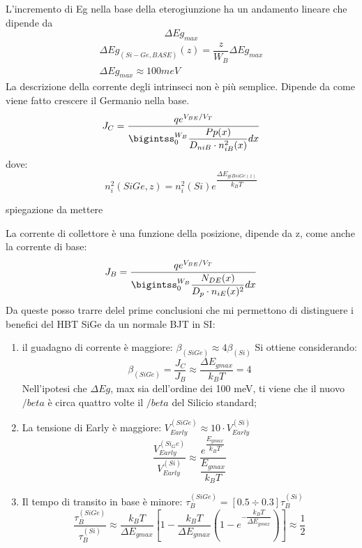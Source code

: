  L’incremento di Eg nella base della eterogiunzione ha un andamento lineare che dipende da 
\[\Delta Eg_{max}\]
\begin{align}
    \Delta Eg_{(Si-Ge,BASE)}(z)=\dfrac{z}{W_B}\Delta Eg_{max} \\
    \Delta Eg_{max} \approx100meV
\end{align}
La descrizione della corrente degli intrinseci non è più semplice. Dipende da come viene fatto crescere il Germanio nella base.
\begin{equation}
    J_C=\dfrac{qe^{V_{BE}/V_T}}{\bigintss_{0}^{W_B}\dfrac{Pp(x)}{D_{niB} \cdot n_{iB}^2(x)}dx}
\end{equation}
%
dove:
%
\begin{equation}
    n_{i}^2(SiGe,z)=n_i^2(Si)e^{\dfrac{\Delta E_{giBsiGe(z)}}{k_BT}}
\end{equation}
%
\begin{exbox}
    spiegazione da mettere
\end{exbox}
%
La corrente di collettore è una funzione della posizione, dipende da z, come anche la corrente di base:
%
\begin{equation}
    J_B=\dfrac{qe^{V_{BE}/V_T}}{\bigintss_{0}^{W_B}\dfrac{N_{DE}(x)}{D_{p}\cdot n_{iE}(x)^2}dx}
\end{equation}
%
Da queste posso trarre delel prime conclusioni che mi permettono di distinguere i benefici del HBT SiGe da un normale BJT in SI:
\begin{enumerate}
    \item il guadagno di corrente è maggiore: $\beta_{(SiGe)}\approx 4 \beta_{(Si)}$
    Si ottiene considerando:
    \begin{equation}
    \beta_{(SiGe)}=\dfrac{J_C}{J_B}\approx \dfrac{\Delta E_{gmax}}{k_BT}=4 
    \end{equation}
    Nell’ipotesi che $\Delta Eg$, max sia dell’ordine dei 100 meV, ti viene che il nuovo $/beta$ è circa quattro volte il $/beta$ del Silicio standard;

    \item La tensione di Early è maggiore: $V_{Early}^{(SiGe)} \approx 10 \cdot V_{Early}^{(Si)}$
    \begin{equation}
    \dfrac{V_{Early}^{(Si_Ge)}}{V_{Early}^{(Si)}}\approx \dfrac{e^{\dfrac{E_{gmax}}{k_BT}}}{\dfrac {E_{gmax}}{k_BT}} 
    \end{equation}

    \item Il tempo di transito in base è minore: $\tau_B^{(SiGe)}= [0.5 \div 0.3] \tau_B^{(Si)}$
    \begin{equation}
    \dfrac{\tau_B^{(SiGe)}}{\tau_B^{(Si)}}\approx \dfrac{k_BT}{\Delta E_{gmax}}\left[ 1-\dfrac{k_BT}{\Delta E_{gmax}} \left( 1-e^{-\dfrac{k_BT}{\Delta E_{gmax}}}\right)\right] \approx \dfrac{1}{2}
    \end{equation}
\end{enumerate}

